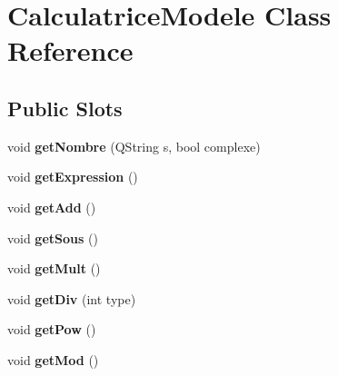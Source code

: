 \hypertarget{class_calculatrice_modele}{\section{Calculatrice\-Modele Class Reference}
\label{class_calculatrice_modele}
}
\subsection*{Public Slots}
\begin{DoxyCompactItemize}
\item 
\hypertarget{class_calculatrice_modele_a2214a44a1baedaaa580520967595b224}{void {\bfseries get\-Nombre} (Q\-String s, bool complexe)}\label{class_calculatrice_modele_a2214a44a1baedaaa580520967595b224}

\item 
\hypertarget{class_calculatrice_modele_a381382f5fb175a17915a057009051d4a}{void {\bfseries get\-Expression} ()}\label{class_calculatrice_modele_a381382f5fb175a17915a057009051d4a}

\item 
\hypertarget{class_calculatrice_modele_a607d33dc6cf27f3a6720b16d1891627a}{void {\bfseries get\-Add} ()}\label{class_calculatrice_modele_a607d33dc6cf27f3a6720b16d1891627a}

\item 
\hypertarget{class_calculatrice_modele_ac545a816c1ff8e79f178e17819b6b0c4}{void {\bfseries get\-Sous} ()}\label{class_calculatrice_modele_ac545a816c1ff8e79f178e17819b6b0c4}

\item 
\hypertarget{class_calculatrice_modele_a5865e8e444be2412ef587d5bd95384d3}{void {\bfseries get\-Mult} ()}\label{class_calculatrice_modele_a5865e8e444be2412ef587d5bd95384d3}

\item 
\hypertarget{class_calculatrice_modele_a61acc0db8a62c2b920b8f430231e1d2e}{void {\bfseries get\-Div} (int type)}\label{class_calculatrice_modele_a61acc0db8a62c2b920b8f430231e1d2e}

\item 
\hypertarget{class_calculatrice_modele_a96b09c72f026835a32fabed8777124e2}{void {\bfseries get\-Pow} ()}\label{class_calculatrice_modele_a96b09c72f026835a32fabed8777124e2}

\item 
\hypertarget{class_calculatrice_modele_aeb7d0373268778e2b0e4dc52bef66a76}{void {\bfseries get\-Mod} ()}\label{class_calculatrice_modele_aeb7d0373268778e2b0e4dc52bef66a76}


\end{DoxyCompactItemize}
